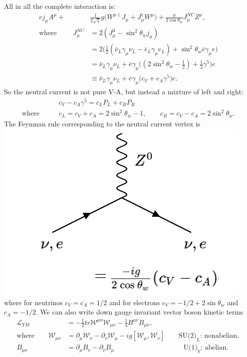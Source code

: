 \documentclass[a4paper,12pt]{article}
\begin{document}
All in all the complete interaction is:
\begin{equation}
\begin{split}
ej_\mu A^\mu + &\frac{1}{2\sqrt{2}}g\big(W^{\mu \dagger}J_\mu + J_\mu^\dagger W^\mu \big) + \frac{g}{2 \cos\theta_w} J_\mu^{NC}Z^\mu, \\
\text{where } \qquad J_\mu^{NC} &= 2(J_\mu^3 - \sin^2\theta_w j_\mu) \\
&= 2\bigg( \frac{1}{2} (\bar{\nu}_L \gamma_\mu \nu_L - \bar{e}_L \gamma_\mu e_L) + \sin^2\theta_w \bar{e} \gamma_\mu e \bigg) \\
&= \bar{\nu}_L \gamma_\mu \nu_L + \bar{e} \gamma_\mu \big( (2\sin^2\theta_w - \frac{1}{2}) + \frac{1}{2} \gamma^5 \big) e \\
&\equiv \bar{\nu}_L \gamma_\mu \nu_L + \bar{e} \gamma_\mu \big(c_V + c_A \gamma^5 \big)e.
\end{split}
\end{equation}
So the neutral current is not pure V-A, but instead a mixture of left and right:
\begin{equation}
\begin{split}
&c_V- c_A\gamma^5 = c_L P_L + c_R P_R \\
\text{where} \qquad &c_L = c_V + c_A = 2 \sin^2\theta_w -1, \qquad c_R = c_V-c_A = 2 \sin^2\theta_w.
\end{split}
\end{equation}
The Feynman rule corresponding to the neutral current vertex is
%
\newline
  \includegraphics[width=0.4\linewidth]{figs/21a.png}
\newline
where for neutrinos $c_V = c_A = 1/2$ and for electrons $c_V = -1/2 + 2\sin\theta_w$ and $c_A = -1/2$. We can also write down gauge invariant vector boson kinetic terms
\begin{equation} \label{eqn:22a}
\begin{split}
\mathcal{L}_{YM} &= - \frac{1}{2} tr \mathcal{W}^{\mu \nu} \mathcal{W}_{\mu \nu} - \frac{1}{4} B^{\mu \nu} B_{\mu \nu}, \\
\text{where} \qquad \mathcal{W}_{\mu \nu} &= \partial_\mu \mathcal{W}_\nu - \partial_\nu \mathcal{W}_\mu -ig[\mathcal{W}_\mu, \mathcal{W}_\nu] \qquad \text{SU(2)}_L \text{: nonabelian}, \\
B_{\mu \nu} &= \partial_\mu B_\nu - \partial_\nu B_\mu \qquad \qquad \qquad \qquad \qquad \text{U(1)}_Y \text{: abelian}.
\end{split}
\end{equation}
\end{document}
